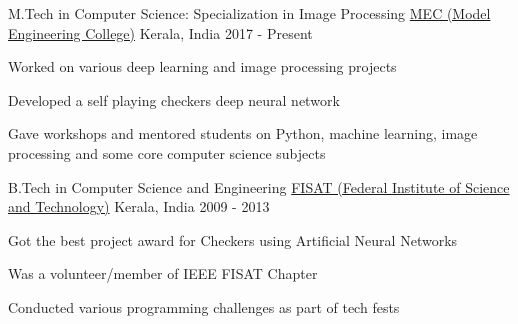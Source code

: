 \begin{cventries}
  \cventry
    {M.Tech in Computer Science: Specialization in Image Processing}
    {\href{http://www.mec.ac.in/}{MEC (Model Engineering College)}}
    {Kerala, India}
    {2017 - Present}
    {
      \begin{cvitems}
        \item {Worked on various deep learning and image processing projects}
        \item {Developed a self playing checkers deep neural network}
        \item {Gave workshops and mentored students on Python, machine learning, image processing and some core computer science subjects}
      \end{cvitems}
    }
  \cventry
    {B.Tech in Computer Science and Engineering}
    {\href{http://fisat.ac.in/}{FISAT (Federal Institute of Science and Technology)}}
    {Kerala, India}
    {2009 - 2013}
    {
      \begin{cvitems}
        \item {Got the best project award for Checkers using Artificial Neural Networks}
        \item {Was a volunteer/member of IEEE FISAT Chapter}
        \item {Conducted various programming challenges as part of tech fests}
      \end{cvitems}
    }
\end{cventries}
